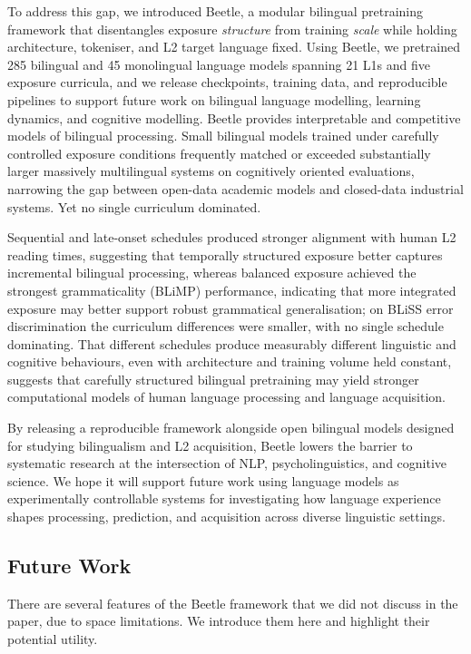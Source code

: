\documentclass[11pt]{article}
\newcommand{\beetle}{Beetle} %
\begin{document}
To address this gap, we introduced \beetle{}, a modular bilingual pretraining framework that disentangles exposure \emph{structure} from training \emph{scale} while holding architecture, tokeniser, and L2 target language fixed. Using \beetle{}, we pretrained 285 bilingual and 45 monolingual language models spanning 21 L1s and five exposure curricula, and we release checkpoints, training data, and reproducible pipelines to support future work on bilingual language modelling, learning dynamics, and cognitive modelling. \beetle{} provides interpretable and competitive models of bilingual processing. Small bilingual models trained under carefully controlled exposure conditions frequently matched or exceeded substantially larger massively multilingual systems on cognitively oriented evaluations, narrowing the gap between open-data academic models and closed-data industrial systems. Yet no single curriculum dominated. 

Sequential and late-onset schedules produced stronger alignment with human L2 reading times, suggesting that temporally structured exposure better captures incremental bilingual processing, whereas balanced exposure achieved the strongest grammaticality (BLiMP) performance, indicating that more integrated exposure may better support robust grammatical generalisation; on BLiSS error discrimination the curriculum differences were smaller, with no single schedule dominating. That different schedules produce measurably different linguistic and cognitive behaviours, even with architecture and training volume held constant, suggests that carefully structured bilingual pretraining may yield stronger computational models of human language processing and language acquisition.

By releasing a reproducible framework alongside open bilingual models designed for studying bilingualism and L2 acquisition, \beetle{} lowers the barrier to systematic research at the intersection of NLP, psycholinguistics, and cognitive science. We hope it will support future work using language models as experimentally controllable systems for investigating how language experience shapes processing, prediction, and acquisition across diverse linguistic settings.


\subsection{Future Work}
There are several features of the \beetle{} framework that we did not discuss in the paper, due to space limitations. We introduce them here and highlight their potential utility.
\end{document}
